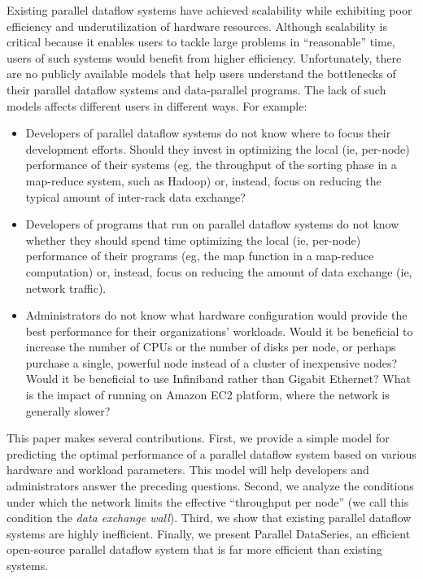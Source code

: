 \documentclass{acm_proc_article-sp}
\begin{document}
Existing parallel dataflow systems have achieved scalability while exhibiting poor efficiency and underutilization of hardware resources. Although scalability is critical because it enables users to tackle large problems in ``reasonable'' time, users of such systems would benefit from higher efficiency. Unfortunately, there are no publicly available models that help users understand the bottlenecks of their parallel dataflow systems and data-parallel programs. The lack of such models affects different users in different ways. For example:
\begin{itemize}
  \item Developers of parallel dataflow systems do not know where to focus their development efforts. Should they invest in optimizing the local (ie, per-node) performance of their systems (eg, the throughput of the sorting phase in a map-reduce system, such as Hadoop) or, instead, focus on reducing the typical amount of inter-rack data exchange?
  \item Developers of programs that run on parallel dataflow systems do not know whether they should spend time optimizing the local (ie, per-node) performance of their programs (eg, the map function in a map-reduce computation) or, instead, focus on reducing the amount of data exchange (ie, network traffic).
  \item Administrators do not know what hardware configuration would provide the best performance for their organizations' workloads. Would it be beneficial to increase the number of CPUs or the number of disks per node, or perhaps purchase a single, powerful node instead of a cluster of inexpensive nodes? Would it be beneficial to use Infiniband rather than Gigabit Ethernet? What is the impact of running on Amazon EC2 \cite{amazonec2} platform, where the network is generally slower?
\end{itemize}

This paper makes several contributions. First, we provide a simple model for predicting the optimal performance of a parallel dataflow system based on various hardware and workload parameters. This model will help developers and administrators answer the preceding questions. Second, we analyze the conditions under which the network limits the effective ``throughput per node'' (we call this condition the \emph{data exchange wall}). Third, we show that existing parallel dataflow systems are highly inefficient. Finally, we present Parallel DataSeries, an efficient open-source parallel dataflow system that is far more efficient than existing systems.
\end{document}
